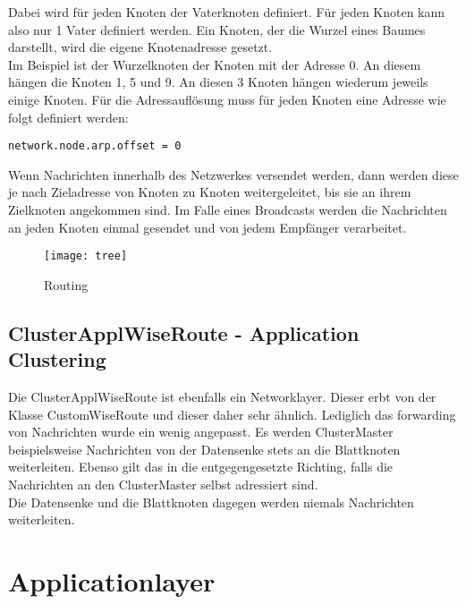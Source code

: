 Dabei wird für jeden Knoten der Vaterknoten definiert. Für jeden Knoten kann also nur 1 Vater definiert werden. Ein Knoten, der die Wurzel eines Baumes darstellt, wird die eigene Knotenadresse gesetzt.\\
Im Beispiel ist der Wurzelknoten der Knoten mit der Adresse 0. An diesem hängen die Knoten 1, 5 und 9. An diesen 3 Knoten hängen wiederum jeweils einige Knoten. Für die Adressauflösung muss für jeden Knoten eine Adresse wie folgt definiert werden:

\begin{minipage}{\textwidth}
\begin{lstlisting}
network.node.arp.offset = 0
\end{lstlisting}
\end{minipage}

Wenn Nachrichten innerhalb des Netzwerkes versendet werden, dann werden diese je nach Zieladresse von Knoten zu Knoten weitergeleitet, bis sie an ihrem Zielknoten angekommen sind. Im Falle eines Broadcasts werden die Nachrichten an jeden Knoten einmal gesendet und von jedem Empfänger verarbeitet.

\begin{figure}[htbp]
\centering
\caption{Routing}
\label{fig:routingbsp}
\texttt{[image: tree]}
\end{figure}

\subsection{ClusterApplWiseRoute - Application Clustering}
Die ClusterApplWiseRoute ist ebenfalls ein Networklayer. Dieser erbt von der Klasse CustomWiseRoute und dieser daher sehr ähnlich. Lediglich das forwarding von Nachrichten wurde ein wenig angepasst. Es werden ClusterMaster beispielsweise Nachrichten von der Datensenke stets an die Blattknoten weiterleiten. Ebenso gilt das in die entgegengesetzte Richting, falls die Nachrichten an den ClusterMaster selbst adressiert sind.\\
Die Datensenke und die Blattknoten dagegen werden niemals Nachrichten weiterleiten.

\section{Applicationlayer}

